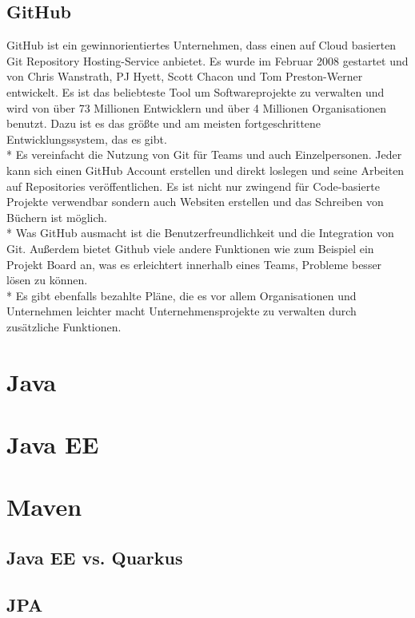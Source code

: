 \subsection{GitHub}
GitHub ist ein gewinnorientiertes Unternehmen, dass einen auf Cloud basierten Git Repository Hosting-Service anbietet.
Es wurde im Februar 2008 gestartet und von Chris Wanstrath, PJ Hyett, Scott Chacon und Tom Preston-Werner entwickelt.
Es ist das beliebteste Tool um Softwareprojekte zu verwalten und wird von über 73 Millionen Entwicklern und über 4 Millionen Organisationen
benutzt. Dazu ist es das größte und am meisten fortgeschrittene Entwicklungssystem, das es gibt. \cite{GitHub} \\*
Es vereinfacht die Nutzung von Git für Teams und auch Einzelpersonen. 
Jeder kann sich einen GitHub Account erstellen und direkt loslegen und seine Arbeiten auf Repositories veröffentlichen.
Es ist nicht nur zwingend für Code-basierte Projekte verwendbar sondern auch Websiten erstellen und das Schreiben von Büchern ist möglich.
\\*
Was GitHub ausmacht ist die Benutzerfreundlichkeit und die Integration von Git. Außerdem bietet Github viele andere Funktionen wie zum Beispiel ein Projekt Board an,
was es erleichtert innerhalb eines Teams, Probleme besser lösen zu können. \\*
Es gibt ebenfalls bezahlte Pläne, die es vor allem Organisationen und Unternehmen leichter macht Unternehmensprojekte zu verwalten durch zusätzliche Funktionen.
\cite{GitKinsta}



\section{Java}

\section{Java EE}

\section{Maven}

\subsection{Java EE vs. Quarkus}

\subsection{JPA}

